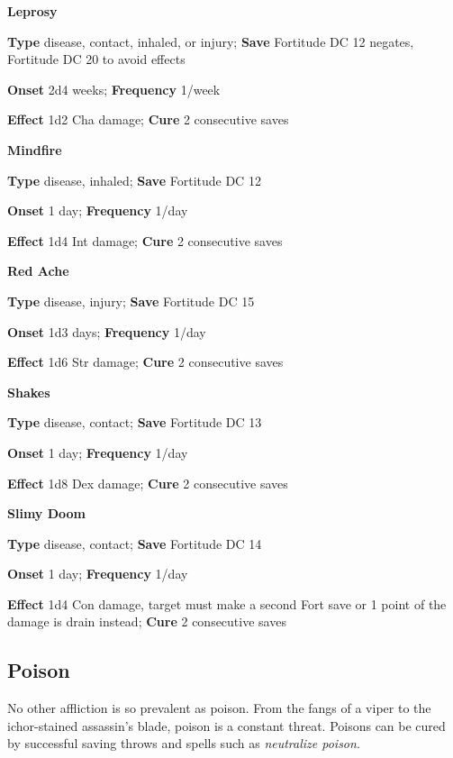 \textbf{Leprosy}
				
\textbf{Type} disease, contact, inhaled, or injury; \textbf{Save} Fortitude DC 12 negates, Fortitude DC 20 to avoid effects
				
\textbf{Onset }2d4 weeks; \textbf{Frequency} 1/week
				
\textbf{Effect }1d2 Cha damage;\textbf{ Cure} 2 consecutive saves
				
\textbf{Mindfire }
				
\textbf{Type} disease, inhaled; \textbf{Save} Fortitude DC 12 
				
\textbf{Onset }1 day; \textbf{Frequency} 1/day
				
\textbf{Effect }1d4 Int damage;\textbf{ Cure} 2 consecutive saves
				
\textbf{Red Ache }
				
\textbf{Type} disease, injury; \textbf{Save} Fortitude DC 15 
				
\textbf{Onset }1d3 days; \textbf{Frequency} 1/day
				
\textbf{Effect }1d6 Str damage;\textbf{ Cure} 2 consecutive saves
				
\textbf{Shakes }
				
\textbf{Type} disease, contact; \textbf{Save} Fortitude DC 13 
				
\textbf{Onset }1 day; \textbf{Frequency} 1/day
				
\textbf{Effect }1d8 Dex damage;\textbf{ Cure} 2 consecutive saves
				
\textbf{Slimy Doom }
				
\textbf{Type} disease, contact; \textbf{Save} Fortitude DC 14 
				
\textbf{Onset }1 day; \textbf{Frequency} 1/day
				
\textbf{Effect }1d4 Con damage, target must make a second Fort save or 1 point of the damage is drain instead;\textbf{ Cure} 2 consecutive saves
				
\subsection{Poison}

				
No other affliction is so prevalent as poison. From the fangs of a viper to the ichor-stained assassin's blade, poison is a constant threat. Poisons can be cured by successful saving throws and spells such as \textit{neutralize poison}. 
				
